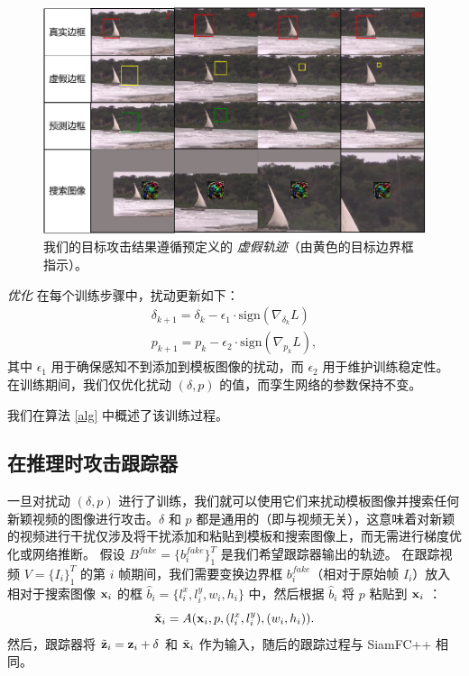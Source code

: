 \begin{figure}[t]
\centering
\includegraphics[width=1.0\textwidth]{Img/attack/vis_v4.pdf}
\caption{我们的目标攻击结果遵循预定义的 \textit{虚假轨迹}（由黄色的目标边界框指示）。}
\label{fig:vis}
\end{figure}

\textit{优化} 在每个训练步骤中，扰动更新如下：
\begin{gather}
\delta_{k+1} = \delta_{k} - \epsilon_1 \cdot \text{sign}(\nabla_{\delta_k}L)\\
p_{k+1} = p_{k} - \epsilon_2 \cdot \text{sign}(\nabla_{p_k}L),
\end{gather}
其中 $\epsilon_1$ 用于确保感知不到添加到模板图像的扰动，而 $\epsilon_2$ 用于维护训练稳定性。
在训练期间，我们仅优化扰动 $(\delta, p)$ 的值，而孪生网络的参数保持不变。

我们在算法 \ref{alg} 中概述了该训练过程。

\subsection{在推理时攻击跟踪器}

一旦对扰动 $(\delta, p)$ 进行了训练，我们就可以使用它们来扰动模板图像并搜索任何新颖视频的图像进行攻击。$\delta$ 和 $p$ 都是通用的（即与视频无关），这意味着对新颖的视频进行干扰仅涉及将干扰添加和粘贴到模板和搜索图像上，而无需进行梯度优化或网络推断。
假设 $B^{fake}=\{b^{fake}_i\}_1^{T}$ 是我们希望跟踪器输出的轨迹。
在跟踪视频 $V=\{I_i\}_1^T$ 的第 $i$ 帧期间，我们需要变换边界框 $b^{fake}_i$（相对于原始帧 $I_i$）放入相对于搜索图像 $\textbf x_i$ 的框 $\hat b_i=\{l^x_i, l^y_i, w_i, h_i\}$ 中，然后根据 $\hat b_i$ 将 $p$ 粘贴到 $\textbf x_i$ ：
\begin{equation}
\tilde{\textbf x}_i = A(\textbf x_i, p, (l^x_i, l^y_i), (w_i, h_i)).
\end{equation}
然后，跟踪器将 $\tilde{\textbf z}_i=\textbf z_i+\delta$ 和 $\tilde{\textbf x}_i$ 作为输入，随后的跟踪过程与 SiamFC++ 相同。

